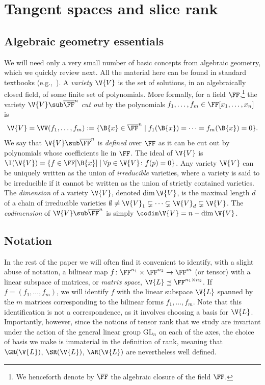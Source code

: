\section{Tangent spaces and slice rank}\label{sec:tan}

\subsection{Algebraic geometry essentials}

We will need only a very small number of basic concepts from algebraic geometry, which we quickly review next. All the material here can be found in standard textbooks (e.g.,~\cite{Harris,Shafarevich}).
A \emph{variety} $\V{V}$ is the set of solutions, in an algebraically closed field, of some finite set of polynomials.
More formally, for a field $\FF$,\footnote{We henceforth denote by $\overline{\FF}$ the algebraic closure of the field $\FF$.}
the variety $\V{V} \sub \overline{\FF}^n$ \emph{cut out}
by the polynomials $f_1,\ldots,f_m \in \FF[x_1,\ldots,x_n]$ is 
$$\V{V} = \VV(f_1,\ldots,f_m) := \{ \B{x} \in \overline{\FF}^n \mid  f_1(\B{x})=\cdots=f_m(\B{x})=0\} .$$
We say that $\V{V} \sub \overline{\FF}^n$ is \emph{defined} over $\FF$ as it can be cut out by polynomials whose coefficients lie in $\FF$.
The ideal of $\V{V}$ is $\I(\V{V})=\{f \in \FF[\B{x}] \mid \forall p \in \V{V} \colon f(p)=0\}$.
Any variety $\V{V}$ can be uniquely written as the union of \emph{irreducible} varieties, where a variety is said to be irreducible if it cannot be written as the union of strictly contained varieties.
The \emph{dimension} of a variety $\V{V}$, denoted $\dim\V{V}$, is the maximal length $d$ of a chain of irreducible varieties 
$\emptyset \neq \V{V}_1 \subsetneq\cdots\subsetneq \V{V}_d \subsetneq \V{V}$.
The \emph{codimension} of $\V{V} \sub \overline{\FF}^n$ is simply $\codim\V{V}=n-\dim\V{V}$.


\subsection{Notation}\label{subsec:notation}

In the rest of the paper we will often find it convenient to identify, with a slight abuse of notation,
a bilinear map $f \colon \FF^{n_1} \times \FF^{n_2} \to \FF^m$ (or tensor) with a linear subspace of matrices, or \emph{matrix space}, $\V{L} \preceq \FF^{n_1 \times n_2}$.
If $f=(f_1,\ldots,f_m)$, we will identify $f$ with the linear subspace $\V{L}$ spanned by the $m$ matrices corresponding to the bilinear forms $f_1,\ldots,f_m$.
Note that this identification is not a correspondence, as it involves choosing a basis for $\V{L}$.  
Importantly, however, since the notions of tensor rank that we study are invariant under the action of the general linear group $\mathrm{GL}_n$ on each of the axes, the choice of basis we make is immaterial in the definition of rank, meaning that $\GR(\V{L})$, $\SR(\V{L})$, $\AR(\V{L})$ are nevertheless well defined. 

